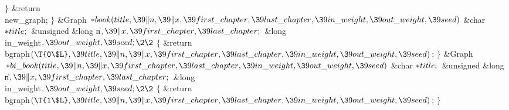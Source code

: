 \4${}\}{}$\2\6
\&{return} \\{new\_graph};\6
\4${}\}{}$\2\7
\1\1\&{Graph} ${}{*}\\{book}(\\{title},\39\|n,\39\|x,\39\\{first\_chapter},\39%
\\{last\_chapter},\39\\{in\_weight},\39\\{out\_weight},\39\\{seed}){}$\6
\&{char} ${}{*}\\{title};{}$\6
\&{unsigned} \&{long} \|n${},\39\|x,\39\\{first\_chapter},\39\\{last%
\_chapter};{}$\6
\&{long} \\{in\_weight}${},\39\\{out\_weight},\39\\{seed};\2\2{}$\6
${}\{{}$\5
\1\&{return} \\{bgraph}${}(\T{0\$L},\39\\{title},\39\|n,\39\|x,\39\\{first%
\_chapter},\39\\{last\_chapter},\39\\{in\_weight},\39\\{out\_weight},\39%
\\{seed}){}$;\5
${}\}{}$\2\7
\1\1\&{Graph} ${}{*}\\{bi\_book}(\\{title},\39\|n,\39\|x,\39\\{first\_chapter},%
\39\\{last\_chapter},\39\\{in\_weight},\39\\{out\_weight},\39\\{seed}){}$\6
\&{char} ${}{*}\\{title};{}$\6
\&{unsigned} \&{long} \|n${},\39\|x,\39\\{first\_chapter},\39\\{last%
\_chapter};{}$\6
\&{long} \\{in\_weight}${},\39\\{out\_weight},\39\\{seed};\2\2{}$\6
${}\{{}$\5
\1\&{return} \\{bgraph}${}(\T{1\$L},\39\\{title},\39\|n,\39\|x,\39\\{first%
\_chapter},\39\\{last\_chapter},\39\\{in\_weight},\39\\{out\_weight},\39%
\\{seed}){}$;\5
${}\}{}$\2\par
\fi

